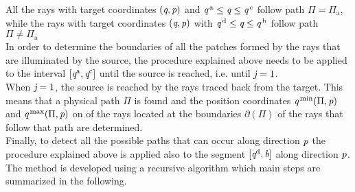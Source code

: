 All the rays with target coordinates $(\textit{q}, \textit{p})$ and $\textit{q}^{\,\textrm{a}}\leq\textit{q}\leq\textit{q}^{\,\textrm{c}}$ follow path $\Pi = \Pi_{\textrm{a}}$, while the rays with target coordinates $(\textit{q}, \textit{p})$ with $\textit{q}^{\,\textrm{d}}\leq\textit{q}\leq\textit{q}^{\,\textrm{b}}$ follow path $\Pi \neq \Pi_{\textrm{a}}$
\\ \indent In order to determine the boundaries of all the patches formed by the rays that are illuminated by the source, the procedure explained above needs to be applied to the interval 
$[\textit{q}^{\textrm{a}},\textit{q}^{\textrm{c}}]$ until the source is reached, i.e. until $\textit{j}=1$. 
\\ \indent
When $\textit{j}=1$, the source is reached by the rays traced back from the target. This means that a physical path $\Pi$ is found and the position coordinates $\textit{q}^{\textrm{\,min}}(\Pi, \textit{p})$ and $\textit{q}^{\textrm{\,max}}(\Pi, \textit{p})$ on  of the rays located at the boundaries $\partial$$(\Pi)$ of the rays that follow that path are determined. \\ \indent 
Finally, to detect all the possible paths that can occur along direction $\textit{p}$ the procedure explained above is applied also to the segment $[\textit{q}^{\textrm{d}}, \textit{\textrm{b}}]$ along direction $\textit{p}$. 
The method is developed using a recursive algorithm which main steps are summarized in the following.
